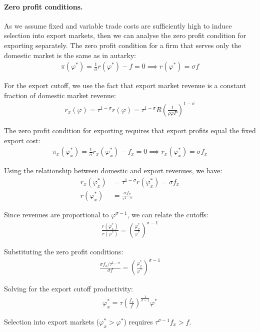\begin{solution}
		\paragraph{Zero profit conditions.} As we assume fixed and variable trade costs are sufficiently high to induce selection into export markets, then we can analyse the zero profit condition for exporting separately. The zero profit condition for a firm that serves only the domestic market is the same as in autarky:
		\begin{align*}
			\pi(\varphi^*) = \frac{1}{\sigma} r(\varphi^*) - f = 0 \implies r(\varphi^*) = \sigma f
		\end{align*}
		
		For the export cutoff, we use the fact that export market revenue is a constant fraction of domestic market revenue:
		\begin{align*}
			r_x(\varphi) = \tau^{1-\sigma} r(\varphi) = \tau^{1-\sigma} R \left( \frac{1}{\rho \varphi P} \right)^{1 - \sigma}
		\end{align*}
		
		The zero profit condition for exporting requires that export profits equal the fixed export cost:
		\begin{align*}
			\pi_x(\varphi_x^*) = \frac{1}{\sigma} r_x(\varphi_x^*) - f_x = 0 \implies r_x(\varphi_x^*) = \sigma f_x
		\end{align*}
		
		Using the relationship between domestic and export revenues, we have:
		\begin{align*}
			r_x(\varphi_x^*) &= \tau^{1-\sigma} r(\varphi_x^*) = \sigma f_x \\
			r(\varphi_x^*) &= \frac{\sigma f_x}{\tau^{1-\sigma}}
		\end{align*}
		
		Since revenues are proportional to $\varphi^{\sigma-1}$, we can relate the cutoffs:
		\begin{align*}
			\frac{r(\varphi_x^*)}{r(\varphi^*)} = \left( \frac{\varphi_x^*}{\varphi^*} \right)^{\sigma-1}
		\end{align*}
		
		Substituting the zero profit conditions:
		\begin{align*}
			\frac{\sigma f_x / \tau^{1-\sigma}}{\sigma f} = \left( \frac{\varphi_x^*}{\varphi^*} \right)^{\sigma-1}
		\end{align*}
		
		Solving for the export cutoff productivity:
		\begin{align*}
			\varphi_x^* = \tau \left( \frac{f_x}{f} \right)^{\frac{1}{\sigma-1}} \varphi^*
		\end{align*}
		
		Selection into export markets ($\varphi_x^* > \varphi^*$) requires $\tau^{\sigma-1} f_x > f$.
	\end{solution}